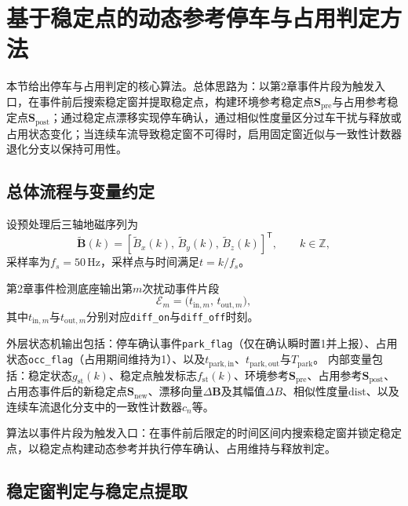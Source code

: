 \documentclass{xdupgthesis}
\begin{document}
\section{基于稳定点的动态参考停车与占用判定方法}
\label{sec:ch4_method}

本节给出停车与占用判定的核心算法。总体思路为：以第2章事件片段为触发入口，在事件前后搜索稳定窗并提取稳定点，构建环境参考稳定点$\mathbf{S}_{\mathrm{pre}}$与占用参考稳定点$\mathbf{S}_{\mathrm{post}}$；通过稳定点漂移实现停车确认，通过相似性度量区分过车干扰与释放或占用状态变化；当连续车流导致稳定窗不可得时，启用固定窗近似与一致性计数器退化分支以保持可用性。

\subsection{总体流程与变量约定}
\label{subsec:ch4_vars}

设预处理后三轴地磁序列为
\begin{equation}
\widetilde{\mathbf{B}}(k) = \left[\widetilde{B}_x(k), \, \widetilde{B}_y(k), \, \widetilde{B}_z(k)\right]^{\mathsf{T}}, \qquad k \in \mathbb{Z},
\label{eq:ch4_Bvec}
\end{equation}
采样率为$f_s = 50\,\mathrm{Hz}$，采样点与时间满足$t=k/f_s$。

第2章事件检测底座输出第$m$次扰动事件片段
\begin{equation}
\mathcal{E}_m = \bigl(t_{\mathrm{in},m},\, t_{\mathrm{out},m}\bigr),
\end{equation}
其中$t_{\mathrm{in},m}$与$t_{\mathrm{out},m}$分别对应\texttt{diff\_on}与\texttt{diff\_off}时刻。

外层状态机输出包括：停车确认事件\texttt{park\_flag}（仅在确认瞬时置1并上报）、占用状态\texttt{occ\_flag}（占用期间维持为1）、以及$t_{\mathrm{park,in}}$、$t_{\mathrm{park,out}}$与$T_{\mathrm{park}}$。
内部变量包括：稳定状态$g_{\mathrm{st}}(k)$、稳定点触发标志$f_{\mathrm{st}}(k)$、环境参考$\mathbf{S}_{\mathrm{pre}}$、占用参考$\mathbf{S}_{\mathrm{post}}$、占用态事件后的新稳定点$\mathbf{S}_{\mathrm{new}}$、漂移向量$\Delta\mathbf{B}$及其幅值$\Delta B$、相似性度量$\mathrm{dist}$、以及连续车流退化分支中的一致性计数器$c_n$等。

算法以事件片段为触发入口：在事件前后限定的时间区间内搜索稳定窗并锁定稳定点，以稳定点构建动态参考并执行停车确认、占用维持与释放判定。

\subsection{稳定窗判定与稳定点提取}
\label{subsec:ch4_stable}
\end{document}
